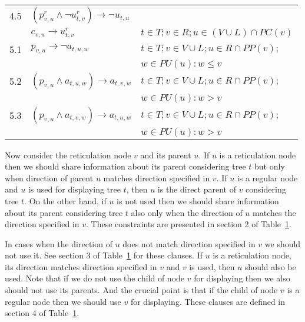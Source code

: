 \documentclass[runningheads, envcountsame, a4paper]{llncs}
\begin{document}
\begin{table}[t]
{\begin{tabular}{l | l | l}
  4.5 &
  $(p^r_{v,u} \wedge \neg u^r_{t,v}) \rightarrow \neg u_{t,u}$ &
  \\

  \hdashline
  4.6 &
  $c_{v,u} \rightarrow u^r_{t,v}$ &
  $t \in T; v \in R; u \in \left(V \cup L\right) \cap PC(v)$
  \\

  \hline
  5.1 &
  $p_{v,u} \rightarrow \neg a_{t,u,w}$ &
  $t \in T; v \in V \cup L; u \in R \cap PP(v);$
  \\ & & \quad$w \in PU(u): w \leq v$
  \\
  
  5.2 &
  $(p_{v,u} \wedge a_{t,u,w}) \rightarrow a_{t,v,w}$ &
  $t \in T; v \in V \cup L; u \in R \cap PP(v);$
  \\ & & \quad$w \in PU(u): w > v$
  \\
  
  5.3 &
  $(p_{v,u} \wedge a_{t,v,w}) \rightarrow a_{t,u,w}$ &
  $t \in T; v \in V \cup L; u \in R \cap PP(v);$
  \\ & & \quad$w \in PU(u): w > v$
  \\

\end{tabular}
}
\label{child-parent-table}
\end{table}

Now consider the reticulation node $v$ and its parent $u$. If $u$ is a reticulation node then we should share information 
about its parent considering tree $t$ but only when direction of parent $u$ matches direction specified in $v$. 
If $u$ is a regular node and $u$ is used for displaying tree $t$, then $u$ is the direct parent of $v$ considering tree $t$.
On the other hand, if $u$ is not used then we should share information about its parent considering tree $t$ also 
only when the direction of $u$ matches the direction specified in $v$. These constraints are presented in section 2 of Table~\ref{child-parent-table}.

In cases when the direction of $u$ does not match direction specified in $v$ we should not use it. See section 3 of Table~\ref{child-parent-table} 
for these clauses. If $u$ is a reticulation node, its direction matches direction specified in $v$ and $v$ is used, then $u$ should also be used.
Note that if we do not use the child of node $v$ for displaying then we also should not use its parents. And the crucial point is that
if the child of node $v$ is a regular node then we should use $v$ for displaying. 
These clauses are defined in section 4 of Table~\ref{child-parent-table}.
\end{document}
